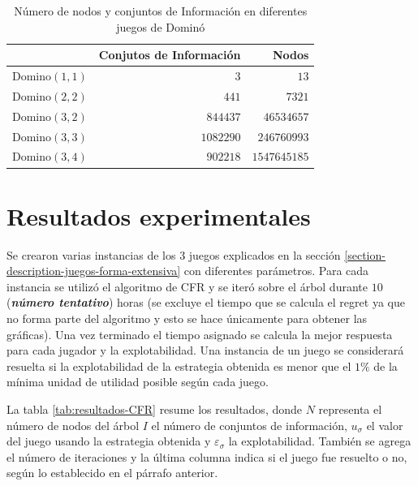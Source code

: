 \begin{table}[ht]
    \centering
    \begin{tabular}{c|r|r}
        & Conjutos de Información & Nodos \\ \hline
       Domino$(1, 1)$ & $3$ & $13$ \\
       Domino$(2, 2)$ & $441$   & $7321$ \\
       Domino$(3, 2)$ & $844437$   & $46534657$ \\
       Domino$(3, 3)$ & $1082290$   & $246760993$ \\ 
       Domino$(3, 4)$ & $902218$   & $1547645185$ \\ \hline
    \end{tabular}
    \caption{Número de nodos y conjuntos de Información en diferentes juegos de Dominó}
    \label{tab:tree-domino}
\end{table}


\section{Resultados experimentales}

Se crearon varias instancias de los $3$ juegos explicados en la sección \ref{section-description-juegos-forma-extensiva} con diferentes parámetros. Para cada instancia se utilizó el algoritmo de CFR y se iteró sobre el árbol durante $10$ (\textit{\textbf{número tentativo}}) horas (se excluye el tiempo que se calcula el regret ya que no forma parte del algoritmo y esto se hace únicamente para obtener las gráficas). Una vez terminado el tiempo asignado se calcula la mejor respuesta para cada jugador y la explotabilidad. Una instancia de un juego se considerará resuelta si la explotabilidad de la estrategia obtenida es menor que el $1\%$ de la mínima unidad de utilidad posible según cada juego.

La tabla \ref{tab:resultados-CFR} resume los resultados, donde $N$ representa el número de nodos del árbol $I$ el número de conjuntos de información, $u_{\sigma}$ el valor del juego usando la estrategia obtenida y $\varepsilon_{\sigma}$ la explotabilidad. También se agrega el número de iteraciones y la última columna indica si el juego fue resuelto o no, según lo establecido en el párrafo anterior.

